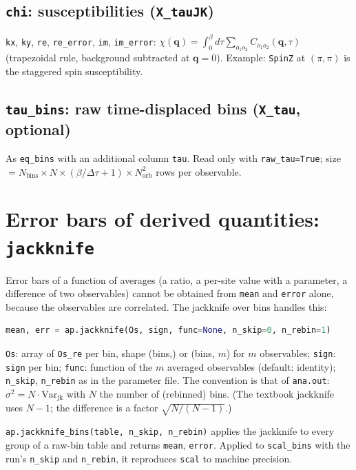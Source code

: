 \documentclass[11pt,a4paper]{article}
\newcommand{\f}[1]{\texttt{#1}}
\begin{document}
\subsection{\texttt{chi}: susceptibilities (\texttt{X\_tauJK})}
\f{kx}, \f{ky}, \f{re}, \f{re\_error}, \f{im}, \f{im\_error}:
$\chi(\mathbf q)=\int_0^\beta d\tau\sum_{o_1o_2}C_{o_1o_2}(\mathbf q,\tau)$ (trapezoidal rule,
background subtracted at $\mathbf q=0$). Example: \f{SpinZ} at $(\pi,\pi)$ is the staggered
spin susceptibility.

\subsection{\texttt{tau\_bins}: raw time-displaced bins (\texttt{X\_tau}, optional)}
As \f{eq\_bins} with an additional column \f{tau}. Read only with \f{raw\_tau=True}; size
$=N_\text{bins}\times N\times(\beta/\Delta\tau+1)\times N_\text{orb}^2$ rows per observable.

\section{Error bars of derived quantities: \texttt{jackknife}}
\label{sec:jackknife}

Error bars of a function of averages (a ratio, a per-site value with a parameter, a
difference of two observables) cannot be obtained from \f{mean} and \f{error} alone, because
the observables are correlated. The jackknife over bins handles this:
\begin{lstlisting}[language=Python]
mean, err = ap.jackknife(Os, sign, func=None, n_skip=0, n_rebin=1)
\end{lstlisting}
\f{Os}: array of \f{Os\_re} per bin, shape (bins,) or (bins, $m$) for $m$ observables;
\f{sign}: \f{sign} per bin; \f{func}: function of the $m$ averaged observables (default:
identity); \f{n\_skip}, \f{n\_rebin} as in the parameter file. The convention is that of
\f{ana.out}: $\sigma^2=N\cdot\mathrm{Var}_\text{jk}$ with $N$ the number of (rebinned) bins.
(The textbook jackknife uses $N-1$; the difference is a factor $\sqrt{N/(N-1)}$.)

\f{ap.jackknife\_bins(table, n\_skip, n\_rebin)} applies the jackknife to every group of a
raw-bin table and returns \f{mean}, \f{error}. Applied to \f{scal\_bins} with the run's
\f{n\_skip} and \f{n\_rebin}, it reproduces \f{scal} to machine precision.
\end{document}
